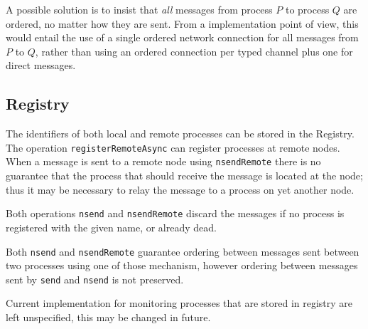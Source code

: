 \documentclass{article}
\begin{document}
A possible solution is to insist that \emph{all} messages from process $P$ to
process $Q$ are ordered, no matter how they are sent. From a implementation
point of view, this would entail the use of a single ordered network connection
for all messages from $P$ to $Q$, rather than using an ordered connection per
typed channel plus one for direct messages.

\subsection{Registry}
The identifiers of both local and remote processes can be stored in the Registry.
The operation \texttt{registerRemoteAsync} can register processes at remote nodes.
When a message is sent to a remote node using \texttt{nsendRemote} there is no
guarantee that the process that should receive the message is located at the
node; thus it may be necessary to relay the message to a process on yet another node.

Both operations \texttt{nsend} and \texttt{nsendRemote} discard the messages if
no process is registered with the given name, or already dead.

Both \texttt{nsend} and \texttt{nsendRemote} guarantee ordering between messages
sent between two processes using one of those mechanism, however ordering between
messages sent by \texttt{send} and \texttt{nsend} is not preserved.

Current implementation for monitoring processes that are stored in registry
are left unspecified, this may be changed in future.



\end{document}

